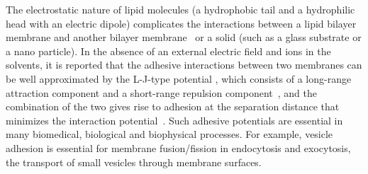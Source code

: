 \documentclass[prf,superscriptaddress,showpacs]{revtex4-1}
\begin{document}
%
The electrostatic
nature of lipid molecules (a hydrophobic tail and a hydrophilic head
with an electric dipole) complicates the interactions between a lipid
bilayer membrane and another bilayer
membrane~\cite{EvansMetcalfe1984_BJ, Book_PhysicalBasisCellAdhesion,Book_IntermolecularSurfaceForces,PerutkovaFrank-Bertoncelij2013_CSB} 
or a solid (such as a glass substrate
or a nano particle).  In the absence of an external electric field and ions in the solvents, 
it is reported that 
the adhesive interactions between two membranes can be well approximated by the 
L-J-type potential \cite{FlormannAouane2017_SciReports}, which consists of a long-range attraction component and a
short-range repulsion component~\cite{Book_IntermolecularSurfaceForces},
and the combination of the two gives rise to adhesion at the separation
distance that minimizes the interaction
potential~\cite{Book_IntermolecularSurfaceForces}. Such adhesive
potentials are essential in many biomedical, biological and biophysical
processes.  For example, vesicle adhesion is essential for membrane
fusion/fission in endocytosis and exocytosis, the transport of small
vesicles through membrane surfaces.
\end{document}
